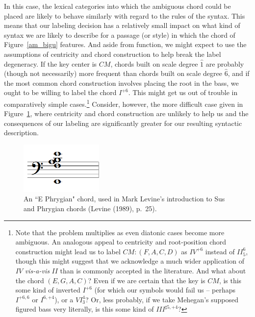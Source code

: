 In this case, the lexical categories into which the ambiguous chord could be placed are likely to behave similarly with regard to the rules of the syntax.  This means that our labeling decision has a relatively small impact on what kind of syntax we are likely to describe for a passage (or style) in which the chord of Figure~\ref{am_bigu} features.  And aside from function, we might expect to use the assumptions of centricity and chord construction to help break the label degeneracy.  If the key center is $CM$, chords built on scale degree $\hat{1}$ are probably (though not necessarily) more frequent than chords built on scale degree $\hat{6}$, and if the most common chord construction involves placing the root in the bass, we ought to be willing to label the chord $I^{+6}$.  This might get us out of trouble in comparatively simple cases.\footnote{Note that the problem multiplies as even diatonic cases become more ambiguous.  An analogous appeal to centricity and root-position chord construction might lead us to label $CM: (F,A,C,D)$ as $IV^{+6}$ instead of $II^{6}_5$, though this might suggest that we acknowledge a much wider application of $IV$ \emph{vis-a-vis} $II$ than is commonly accepted in the literature. And what about the chord $(E,G,A,C)$?  Even if we are certain that the key is $CM$, is this some kind of inverted $I^{+6}$ (for which our symbols would fail us -- perhaps $I^{+6,6}$ or $I^{6,+4}$), or a $VI^{4}_3$?  Or, less probably, if we take Mehegan's supposed figured bass very literally, is this some kind of $III^{\sharp 5, +4}$?}  Consider, however, the more difficult case given in Figure~\ref{phry}, where centricity and chord construction are unlikely to help us and the consequences of our labeling are significantly greater for our resulting syntactic description.
\begin{figure}
	\centering
	\caption{An ``E Phrygian" chord, used in Mark Levine's introduction to Sus and Phrygian chords (Levine (1989), p.\ 25).}
	\label{phry}
	\includegraphics[width=1.6in]{diss_prospectus_ephryg.png}
\end{figure}

